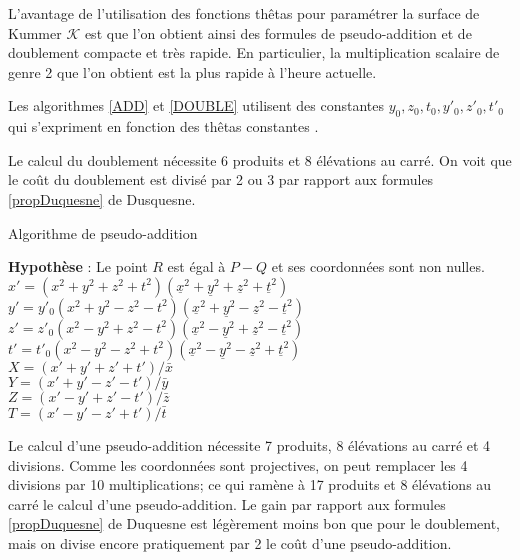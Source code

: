 \documentclass[a4paper,12pt]{article}
\theoremstyle{definition}
\theoremstyle{remark}
\numberwithin{equation}{section}
\begin{document}
L'avantage de l'utilisation des fonctions thêtas pour paramétrer la surface de Kummer $\mathcal{K}$ est que l'on obtient ainsi des formules de pseudo-addition et de doublement compacte et très rapide. En particulier, la multiplication scalaire de genre 2 que l'on obtient est la plus rapide à l'heure actuelle.

Les algorithmes \ref{ADD} et \ref{DOUBLE} utilisent des constantes $y_0,z_0,t_0,y'_0,z'_0,t'_0$ qui s'expriment en fonction des thêtas constantes \citep{gaudry}.

Le calcul du doublement nécessite 6 produits et 8 élévations au carré. On voit que le coût du doublement est divisé par 2 ou 3 par rapport aux formules \ref{propDuquesne} de Dusquesne.

\begin{algorithm}
\label{ADD}
\caption{Algorithme de pseudo-addition}
\textbf{Hypothèse} : Le point $R$ est égal à $P-Q$ et ses coordonnées sont non nulles. \\
$x' = (x^2 + y^2 + z^2 + t^2)(\underline{x}^2 + \underline{y}^2 + \underline{z}^2 + \underline{t}^2)$ \\
$y' = y'_0(x^2 + y^2 - z^2 - t^2)(\underline{x}^2 + \underline{y}^2 - \underline{z}^2 - \underline{t}^2)$ \\
$z' = z'_0(x^2 - y^2 + z^2 - t^2)(\underline{x}^2 - \underline{y}^2 + \underline{z}^2 - \underline{t}^2)$ \\
$t' = t'_0(x^2 - y^2 - z^2 + t^2)(\underline{x}^2 - \underline{y}^2 - \underline{z}^2 + \underline{t}^2)$ \\
$X = (x' + y' + z' + t')/\bar{x}$ \\
$Y = (x' + y' - z' - t')/\bar{y}$ \\
$Z = (x' - y' + z' - t')/\bar{z}$ \\
$T = (x' - y' - z' + t')/\bar{t}$ \\
\end{algorithm}

Le calcul d'une pseudo-addition nécessite 7 produits, 8 élévations au carré et 4 divisions. Comme les coordonnées sont projectives, on peut remplacer les 4 divisions par 10 multiplications; ce qui ramène à 17 produits et 8 élévations au carré le calcul d'une pseudo-addition. Le gain par rapport aux formules \ref{propDuquesne} de Duquesne est légèrement moins bon que pour le doublement, mais on divise encore pratiquement par 2 le coût d'une pseudo-addition.
\end{document}
